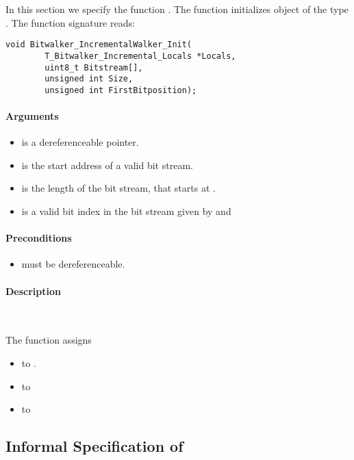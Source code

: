 In this section we specify the function \init.
 The function  initializes object of the type \bitwalkertype.
The function signature reads:\\[1em]


\begin{lstlisting}[style=acsl-block]
void Bitwalker_IncrementalWalker_Init(
        T_Bitwalker_Incremental_Locals *Locals,
        uint8_t Bitstream[],
        unsigned int Size,
        unsigned int FirstBitposition);
\end{lstlisting}


\paragraph{Arguments}
\begin{itemize}
   \item  {} is a dereferenceable pointer.
   \item {} is  the start address of a valid bit stream.
   \item {} is the length of the bit stream, that starts at .
   \item {} is a valid bit index in the bit stream given by  and 
\end{itemize}

\paragraph{Preconditions}
\begin{itemize}
    \item  {} must be dereferenceable.
\end{itemize}

\paragraph{Description}~

The function \init assigns
\begin{itemize}
    \item {}  to .
    \item {} to 
    \item {} to 
\end{itemize}

\clearpage

\subsection{Informal Specification of }


